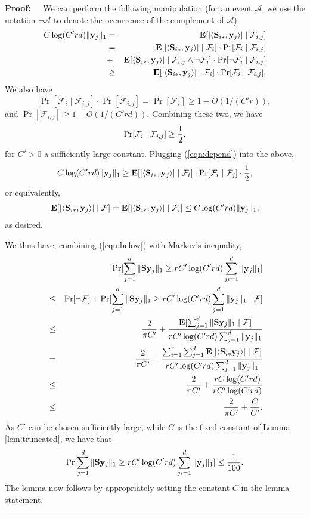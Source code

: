 \documentclass[11pt]{article}
\newenvironment{proof}{\begin{trivlist} \item {\bf Proof:~~}}
  {\qed\end{trivlist}}
\newcommand{\mat}[1]{{\ensuremath{\bm{\mathrm{#1}}}}}
\def\matS{\mat{S}}
\def\frac#1#2{{#1\over #2}}
\def\qed{\hfill\rule{2mm}{2mm}}
\def\y{{\mathbf y}}
\begin{document}
\begin{proof}
We can perform the following manipulation (for an event $\mathcal{A}$, we use the notation
$\neg \mathcal{A}$ to denote the occurrence of the complement of $\mathcal{A}$):
\begin{eqnarray*}
C \log(C'rd) \|\y_j\|_1 & = & {\bf E}[|\langle \matS_{i*}, \y_j \rangle | \mid \mathcal{F}_{i,j}]\\
& = & {\bf E}[|\langle \matS_{i*}, \y_j \rangle | \mid \mathcal{F}_i] \cdot \Pr[\mathcal{F}_i \mid \mathcal{F}_{i,j}]\\
& + & {\bf E}[\langle \matS_{i*}, \y_j \rangle | \mid \mathcal{F}_{i,j} \wedge \neg \mathcal{F}_i] \cdot \Pr[\neg \mathcal{F}_i \mid \mathcal{F}_{i,j}]\\
& \geq & {\bf E}[|\langle \matS_{i*}, \y_j \rangle | \mid \mathcal{F}_i] \cdot \Pr[\mathcal{F}_i \mid \mathcal{F}_{i,j}].
\end{eqnarray*}
We also have 
$$\Pr[\mathcal{F}_i \mid \mathcal{F}_{i,j}] \cdot \Pr[\mathcal{F}_{i,j}]
= \Pr[\mathcal{F}_i] \geq 1-O(1/(C'r)),$$
and $\Pr[\mathcal{F}_{i,j}] \geq 1-O(1/(C'rd))$. Combining these two, we have
\begin{eqnarray}\label{eqn:depend}
\Pr[\mathcal{F}_i \mid \mathcal{F}_{i,j}] \geq \frac{1}{2},
\end{eqnarray}
for $C' > 0$ a sufficiently large constant. Plugging (\ref{eqn:depend}) into the above,
$$C \log(C'rd) \|\y_j\|_1 
\geq  {\bf E}[|\langle \matS_{i*}, \y_j \rangle | \mid \mathcal{F}_i] \cdot \Pr[\mathcal{F}_i \mid \mathcal{F}_j] \cdot \frac{1}{2},$$
or equivalently, 
\begin{eqnarray}\label{eqn:below}
{\bf E}[|\langle \matS_{i*}, \y_j \rangle| \mid \mathcal{F}] 
= {\bf E}[|\langle \matS_{i*}, \y_j \rangle| \mid \mathcal{F}_i] 
\leq C \log(C'rd) \|\y_j\|_1,
\end{eqnarray}
as desired. 

We thus have, combining (\ref{eqn:below}) with Markov's inequality,
\begin{eqnarray*}
&& \Pr[\sum_{j=1}^d \|\matS \y_j\|_1 \geq r C' \log(C'rd) \sum_{ji=1}^d \|\y_j\|_1]\\
& \leq & \Pr[\neg \mathcal{F}] + 
\Pr[\sum_{j=1}^d \|\matS \y_j\|_1 \geq r C' \log(C'rd) \sum_{j=1}^d \|\y_j\|_1 \mid \mathcal{F}]\\
& \leq & \frac{2}{\pi C'} + 
\frac{{\bf E}[\sum_{j=1}^d \|\matS \y_j\|_1 \mid \mathcal{F}] }{r C' \log(C'rd) \sum_{j=1}^d \|\y_j\|_1}\\
& = & \frac{2}{\pi C'} + 
\frac{\sum_{i=1}^r \sum_{j=1}^d {\bf E}[|\langle \matS_{i*} \y_j \rangle | \mid \mathcal{F}]}
{r C' \log(C'rd) \sum_{j=1}^d \|\y_j\|_1}\\
& \leq & \frac{2}{\pi C'} + \frac{r C \log(C'rd)}{r C' \log(C'rd)}\\
& \leq & \frac{2}{\pi C'} + \frac{C}{C'}.
\end{eqnarray*}
As $C'$ can be chosen sufficiently large, while $C$ is the fixed constant of Lemma \ref{lem:truncated},
we have that
$$\Pr[\sum_{j=1}^d \|\matS \y_j\|_1 \geq r C' \log(C'rd) \sum_{ji=1}^d \|\y_j\|_1] \leq \frac{1}{100}.$$
The lemma now follows by appropriately setting the constant $C$ in the lemma statement. 
\end{proof}
\end{document}

